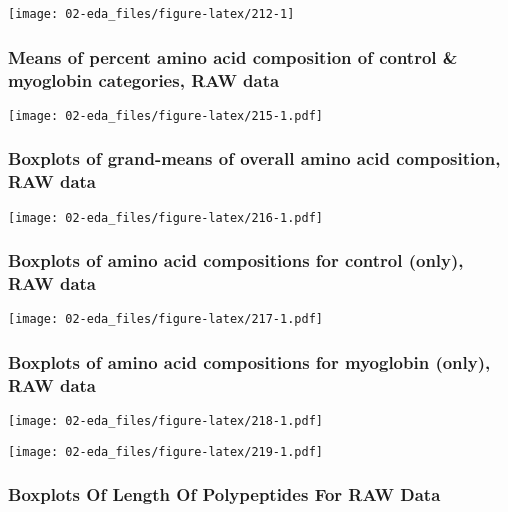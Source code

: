 \documentclass[]{article}
\begin{document}
\begin{center}\texttt{[image: 02-eda\_files/figure-latex/212-1]} \end{center}

\hypertarget{means-of-percent-amino-acid-composition-of-control-myoglobin-categories-raw-data}{%
\subsubsection{Means of percent amino acid composition of control \&
myoglobin categories, RAW
data}\label{means-of-percent-amino-acid-composition-of-control-myoglobin-categories-raw-data}}

\texttt{[image: 02-eda\_files/figure-latex/215-1.pdf]}

\hypertarget{boxplots-of-grand-means-of-overall-amino-acid-composition-raw-data}{%
\subsubsection{Boxplots of grand-means of overall amino acid
composition, RAW
data}\label{boxplots-of-grand-means-of-overall-amino-acid-composition-raw-data}}

\texttt{[image: 02-eda\_files/figure-latex/216-1.pdf]}

\hypertarget{boxplots-of-amino-acid-compositions-for-control-only-raw-data}{%
\subsubsection{Boxplots of amino acid compositions for control (only),
RAW
data}\label{boxplots-of-amino-acid-compositions-for-control-only-raw-data}}

\texttt{[image: 02-eda\_files/figure-latex/217-1.pdf]}

\hypertarget{boxplots-of-amino-acid-compositions-for-myoglobin-only-raw-data}{%
\subsubsection{Boxplots of amino acid compositions for myoglobin (only),
RAW
data}\label{boxplots-of-amino-acid-compositions-for-myoglobin-only-raw-data}}

\texttt{[image: 02-eda\_files/figure-latex/218-1.pdf]}

\texttt{[image: 02-eda\_files/figure-latex/219-1.pdf]}

\hypertarget{boxplots-of-length-of-polypeptides-for-raw-data}{%
\subsubsection{Boxplots Of Length Of Polypeptides For RAW
Data}\label{boxplots-of-length-of-polypeptides-for-raw-data}}
\end{document}
